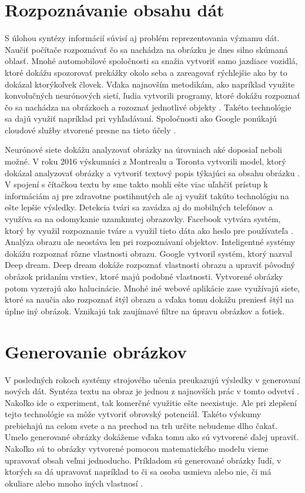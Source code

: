 \section{Rozpoznávanie obsahu dát}
S úlohou syntézy informácií súvisí aj problém reprezentovania významu dát.
Naučiť počítače rozpoznávať čo sa nachádza na obrázku je dnes silno skúmaná oblasť.
Mnohé automobilové spoločnosti sa snažia vytvoriť samo jazdiace vozidlá, ktoré dokážu spozorovať prekážky okolo seba a zareagovať rýchlejšie ako by to dokázal ktorýkoľvek človek.
Vďaka najnovším metodikám, ako napríklad využite konvolučných neurónových sietí,  ľudia vytvorili programy, ktoré dokážu rozpoznať čo sa nachádza na obrázkoch a rozoznať jednotlivé objekty \cite{tensorFlow}.
Takéto technológie sa dajú využiť napríklad pri vyhľadávaní. Spoločnosti ako Google ponúkajú cloudové služby stvorené presne na tieto účely \cite{googleCloud}.

Neurónové siete dokážu analyzovať obrázky na úrovniach aké doposiaľ neboli možné.
V roku 2016 výskumníci z Montrealu a Toronta vytvorili model, ktorý dokázal analyzovať obrázky a vytvoriť textový popis týkajúci sa obsahu obrázku \cite{imageCaption}.
V spojení s čítačkou textu by sme takto mohli ešte viac uľahčiť prístup k informáciám aj pre zdravotne postihnutých ale aj využiť takúto technológiu na ešte lepšie výsledky.
Detekcia tvári sa zavádza aj do mobilných telefónov a využíva sa na odomykanie uzamknutej obrazovky. Facebook vytvára systém, ktorý by využil rozpoznanie tváre a využil tieto dáta ako heslo pre používateľa \cite{facebook}.
Analýza obrazu ale neostáva len pri rozpoznávaní objektov. Inteligentné systémy dokážu rozpoznať rôzne vlastnosti obrazu.
Google vytvoril systém, ktorý nazval Deep dream. Deep dream dokáže rozpoznať vlastnosti obrazu a upraviť pôvodný obrázok pridaním vrstiev, ktoré majú podobné vlastnosti.
Vytvorené obrázky potom vyzerajú ako halucinácie.
Mnohé iné webové aplikácie zase využívajú siete, ktoré sa naučia ako rozpoznať štýl obrazu a vďaka tomu dokážu preniesť štýl na úplne iný obrázok. Vznikajú tak zaujímavé filtre na úpravu obrázkov a fotiek. 

\section{Generovanie obrázkov}
V posledných rokoch systémy strojového učenia preukazujú výsledky v generovaní nových dát.
Syntéza textu na obraz je jednou z najnovších prác v tomto odvetví \cite{text2image}.
Nakoľko ide o experiment, tak komerčné využitie ešte neexistuje. Ale pri zlepšení tejto technológie sa môže vytvoriť obrovský potenciál.
Takéto výskumy prebiehajú na celom svete a na prechod na trh určite nebudeme dlho čakať.
Umelo generované obrázky dokážeme vďaka tomu ako sú vytvorené ďalej upraviť.
Nakoľko sú to obrázky vytvorené pomocou matematického modelu vieme upravovať obsah veľmi jednoducho.
Príkladom sú generované obrázky ľudí, v ktorých sa dá upravovať napríklad to či sa osoba usmieva alebo nie, či má okuliare alebo mnoho iných vlastnosí \cite{DCGAN}.

